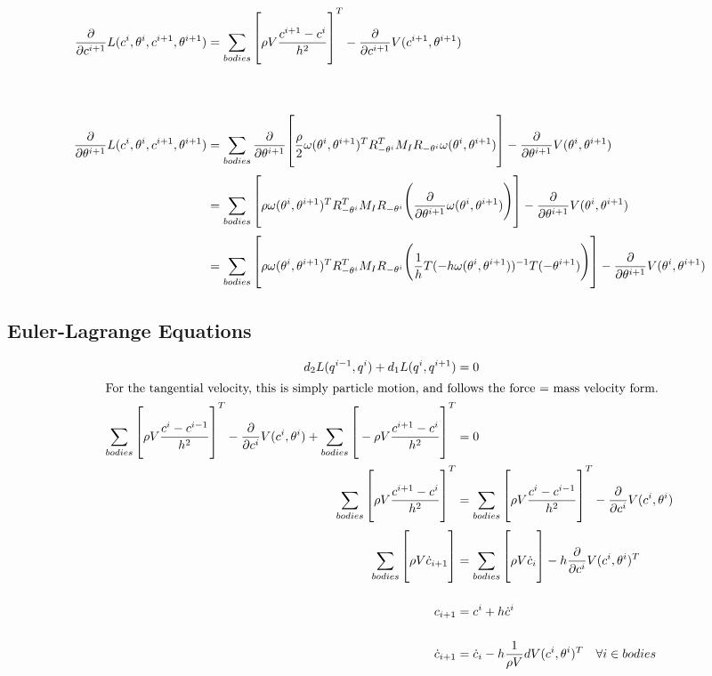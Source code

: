 \documentclass[landscape]{article}
\theoremstyle{definition}
\begin{document}
\begin{align*}
    \frac{\partial}{\partial c^{i+1}} L(c^i, \theta^i, c^{i+1}, \theta^{i+1})
        &= \Huge\sum_{bodies} \Big[ \rho V \frac{c^{i+1} - c^i}{h^2} \Big]^T - \frac{\partial}{\partial c^{i+1}} V(c^{i+1}, \theta^{i+1}) \\ \\
    \frac{\partial}{\partial \theta^{i+1}} L(c^i, \theta^i, c^{i+1}, \theta^{i+1}) 
        &= \Huge\sum_{bodies} \frac{\partial}{\partial \theta^{i+1}} \Big[ \frac{\rho}{2} \omega(\theta^i, \theta^{i+1})^T R_{-\theta^i}^T M_I R_{-\theta^i} \omega(\theta^i, \theta^{i+1}) \Big] - \frac{\partial}{\partial \theta^{i+1}} V(\theta^i, \theta^{i+1}) \\
        &= \Huge\sum_{bodies}  \Big[ \rho \omega(\theta^i, \theta^{i+1})^T R_{-\theta^i}^T M_I R_{-\theta^i} \big( \frac{\partial}{\partial \theta^{i+1}} \omega(\theta^i, \theta^{i+1}) \big) \Big] - \frac{\partial}{\partial \theta^{i+1}} V(\theta^i, \theta^{i+1}) \\
        &= \Huge\sum_{bodies}  \Big[ \rho \omega(\theta^i, \theta^{i+1})^T R_{-\theta^i}^T M_I R_{-\theta^i} \big( \frac{1}{h} T(-h\omega(\theta^i, \theta^{i+1}))^{-1} T(-\theta^{i+1}) \big) \Big] - \frac{\partial}{\partial \theta^{i+1}} V(\theta^i, \theta^{i+1}) \\
\end{align*}

\pagebreak
\subsection{Euler-Lagrange Equations}

\begin{align*}
    d_2 L(q^{i-1}, q^i) + d_1 L(q^i, q^{i+1}) &= 0 \\
    \intertext{For the tangential velocity, this is simply particle motion, and follows the force = mass velocity form.}
    \Huge\sum_{bodies} \Big[ \rho V \frac{c^i - c^{i-1}}{h^2} \Big]^T - \frac{\partial}{\partial c^i} V(c^i, \theta^i) + \Huge\sum_{bodies} \Big[ -\rho V \frac{c^{i+1} - c^i}{h^2} \Big]^T &= 0 \\
     \Huge\sum_{bodies} \Big[ \rho V \frac{c^{i+1} - c^i}{h^2} \Big]^T &= \Huge\sum_{bodies} \Big[ \rho V \frac{c^i - c^{i-1}}{h^2} \Big]^T - \frac{\partial}{\partial c^i} V(c^i, \theta^i) \\
    \Huge\sum_{bodies} \Big[ \rho V \dot{c}_{i+1} \Big] &= \Huge\sum_{bodies} \Big[ \rho V \dot{c}_i \Big] - h \frac{\partial}{\partial c^i} V(c^i, \theta^i)^T \\
    c_{i+1} &= c^i + h \dot{c}^i \\
    \dot{c}_{i+1} &= \dot{c}_i - h \frac{1}{\rho V} dV(c^i, \theta^i)^T \quad \forall i \in bodies
\end{align*}
\end{document}
